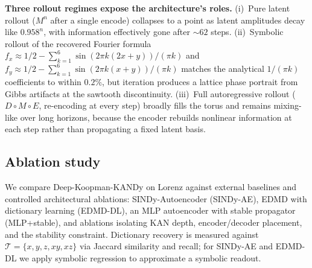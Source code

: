 \documentclass{article}
\begin{document}
\textbf{Three rollout regimes expose the architecture's roles.} (i)~Pure latent
rollout ($M^n$ after a single encode) collapses to a point as latent
amplitudes decay like $0.958^n$, with information effectively gone after
$\sim 62$ steps. (ii)~Symbolic rollout of the recovered Fourier formula
$f_x \approx 1/2 - \sum_{k=1}^{6}\sin(2\pi k(2x+y))/(\pi k)$ and
$f_y \approx 1/2 - \sum_{k=1}^{6}\sin(2\pi k(x+y))/(\pi k)$ matches the
analytical $1/(\pi k)$ coefficients to within $0.2\%$, but iteration produces a
lattice phase portrait from Gibbs artifacts at the sawtooth discontinuity.
(iii)~Full autoregressive rollout ($D\circ M\circ E$, re-encoding at every
step) broadly fills the torus and remains mixing-like over long horizons,
because the encoder rebuilds nonlinear information at each step rather than
propagating a fixed latent basis.


\subsection*{Ablation study}

We compare Deep-Koopman-KANDy on Lorenz against external baselines and
controlled architectural ablations: SINDy-Autoencoder (SINDy-AE), EDMD with
dictionary learning (EDMD-DL), an MLP autoencoder with stable propagator
(MLP+stable), and ablations isolating KAN depth, encoder/decoder placement,
and the stability constraint. Dictionary recovery is measured against
$\mathcal{T}=\{x,y,z,xy,xz\}$ via Jaccard similarity and recall; for SINDy-AE
and EDMD-DL we apply symbolic regression to approximate a symbolic readout.
\end{document}
